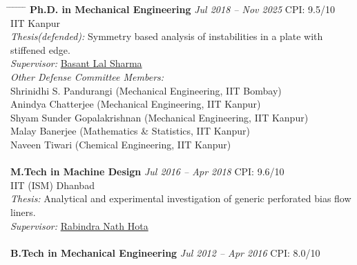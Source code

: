 \documentclass[a4paper,10pt]{article}
\begin{document}
	\begin{tabbing}
		\hspace{0.1cm} \= \hspace{0.1cm} \= \hspace{0.1cm} \= \hspace{1.15cm} \= \hspace{10cm} \= \hspace{3.5cm} \= \kill
		\>\textbf{Ph.D. in Mechanical Engineering} \> \> \> \> \textit{Jul 2018 – Nov 2025} \> \hspace{1cm}CPI: 9.5/10 \\
		\>\> IIT Kanpur \\
		\>\> \> \textit{Thesis(defended):} Symmetry based analysis of instabilities in a plate with stiffened edge.\\
		\>\> \> \textit{Supervisor:} \href{https://home.iitk.ac.in/~bls}{Basant Lal Sharma}\\
		\>\> \> \textit{Other Defense Committee Members:}\\
		 \>\> \> \> Shrinidhi S. Pandurangi (Mechanical Engineering, IIT Bombay)\\
		 \>\> \> \> Anindya Chatterjee (Mechanical Engineering, IIT Kanpur)\\
		 \>\> \> \> Shyam Sunder Gopalakrishnan (Mechanical Engineering, IIT Kanpur)\\
		 \>\> \> \> Malay Banerjee (Mathematics \& Statistics, IIT Kanpur)\\
		 \>\> \> \> Naveen Tiwari (Chemical Engineering, IIT Kanpur)\\		%
		\\[-0.3cm]
		\>\textbf{M.Tech in Machine Design} \> \> \> \> \textit{Jul 2016 – Apr 2018} \> \hspace{1cm}CPI: 9.6/10 \\
		\>\> IIT (ISM) Dhanbad \\
		\>\> \> \textit{Thesis:} Analytical and experimental investigation of generic perforated bias flow liners.\\
		\>\> \> \textit{Supervisor:} \href{https://www.iitism.ac.in/faculty-details?faculty=rnhota}{Rabindra Nath Hota}\\
		\\[-0.3cm]
		\>\textbf{B.Tech in Mechanical Engineering} \> \> \> \> \textit{Jul 2012 – Apr 2016} \> \hspace{1cm}CPI: 8.0/10 \\

\end{tabbing}
\end{document}
